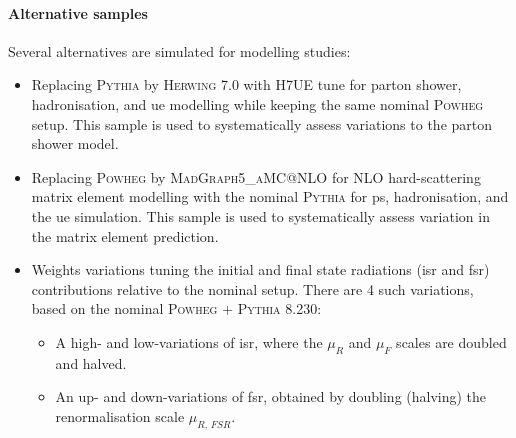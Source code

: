 \paragraph{Alternative samples} Several alternatives are simulated for modelling studies:
\begin{itemize}
  \item Replacing \textsc{Pythia} by \textsc{Herwing} 7.0 with H7UE tune \cite{herwig7R} for parton shower, hadronisation, and \gls{ue} modelling while keeping the same nominal \textsc{Powheg} setup. This sample is used to systematically assess variations to the parton shower model.
  \item Replacing \textsc{Powheg} by \textsc{MadGraph5\_aMC@NLO} \cite{madgraph} for NLO hard-scattering matrix element modelling with the nominal \textsc{Pythia} for \gls{ps}, hadronisation, and the \gls{ue} simulation. This sample is used to systematically assess variation in the matrix element prediction.
  \item Weights variations tuning the initial and final state radiations (\gls{isr} and \gls{fsr}) contributions relative to the nominal setup. There are 4 such variations, based on the nominal \textsc{Powheg} + \textsc{Pythia} 8.230:
  \begin{itemize}
    \item A high- and low-variations of \gls{isr}, where the $\mu_R$ and $\mu_F$ scales are doubled and halved. %
    \item An up- and down-variations of \gls{fsr}, obtained by doubling (halving) the renormalisation scale $\mu_{R,\, FSR}$. %
  \end{itemize}
\end{itemize} 

